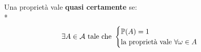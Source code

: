 \medskip
\begin{defn}
  Una proprietà vale \textbf{quasi certamente} se:\\*
  $$\exists A \in \mathcal A \text{  tale che  }
  \begin{cases}
    \mathbb P(A) = 1 \\
    \text{la proprietà vale } \forall \omega \in A
  \end{cases}$$
\end{defn}

\cleardoublepage
